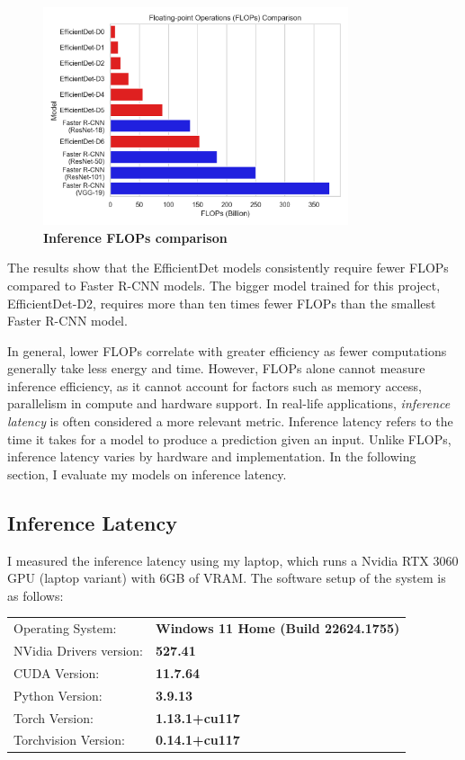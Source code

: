 \documentclass[12pt,a4paper,twoside,openany]{report}
\begin{document}
\begin{figure}
    \centering
    \includegraphics[width=0.8\textwidth]{figs/eval/efficiency/flops_comparisons.png}
    \caption{\textbf{Inference FLOPs comparison}}
\end{figure}

The results show that the EfficientDet models consistently require fewer FLOPs compared to Faster R-CNN models. The bigger model trained for this project, EfficientDet-D2, requires more than ten times fewer FLOPs than the smallest Faster R-CNN model. 

In general, lower FLOPs correlate with greater efficiency as fewer computations generally take less energy and time. However, FLOPs alone cannot measure inference efficiency, as it cannot account for factors such as memory access, parallelism in compute and hardware support. In real-life applications, \textit{inference latency} is often considered a more relevant metric. Inference latency refers to the time it takes for a model to produce a prediction given an input. Unlike FLOPs, inference latency varies by hardware and implementation. In the following section, I evaluate my models on inference latency.

\subsection{Inference Latency}
I measured the inference latency using my laptop, which runs a Nvidia RTX 3060 GPU (laptop variant) with 6GB of VRAM. The software setup of the system is as follows:
\vspace{5mm}

\begin{tabular}{ll}
\hline
Operating System:           & \bf Windows 11 Home (Build 22624.1755) \\
NVidia Drivers version:     & \bf 527.41 \\
CUDA Version:               & \bf   11.7.64 \\
Python Version:             & \bf 3.9.13  \\
Torch Version:              & \bf 1.13.1+cu117 \\
Torchvision Version:        & \bf 0.14.1+cu117 \\
\hline
\end{tabular}
\end{document}
